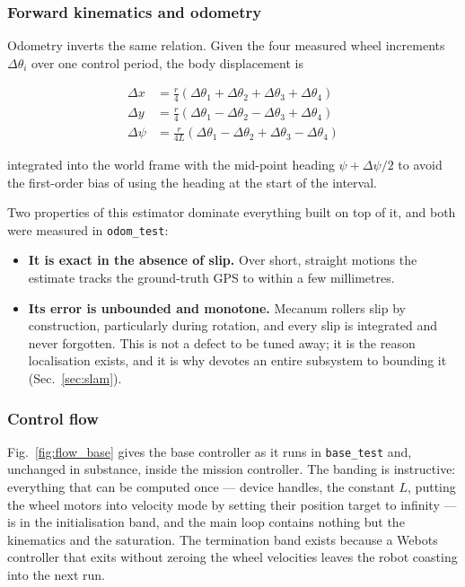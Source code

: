 \subsubsection{Forward kinematics and odometry}

Odometry inverts the same relation. Given the four measured wheel
increments $\Delta\theta_i$ over one control period, the body
displacement is

\begin{align}
\Delta x     &= \tfrac{r}{4}\left(\Delta\theta_1 + \Delta\theta_2
                 + \Delta\theta_3 + \Delta\theta_4\right)\\
\Delta y     &= \tfrac{r}{4}\left(\Delta\theta_1 - \Delta\theta_2
                 - \Delta\theta_3 + \Delta\theta_4\right)\\
\Delta \psi  &= \tfrac{r}{4L}\left(\Delta\theta_1 - \Delta\theta_2
                 + \Delta\theta_3 - \Delta\theta_4\right)
\end{align}

integrated into the world frame with the mid-point heading
$\psi + \Delta\psi/2$ to avoid the first-order bias of using the
heading at the start of the interval.

Two properties of this estimator dominate everything built on top of
it, and both were measured in \texttt{odom\_test}:

\begin{itemize}[leftmargin=*,itemsep=1pt,topsep=2pt]
  \item \textbf{It is exact in the absence of slip.} Over short,
        straight motions the estimate tracks the ground-truth GPS to
        within a few millimetres.
  \item \textbf{Its error is unbounded and monotone.} Mecanum rollers
        slip by construction, particularly during rotation, and every
        slip is integrated and never forgotten. This is not a defect to
        be tuned away; it is the reason localisation exists, and it is
        why \phaseB{} devotes an entire subsystem to bounding it
        (Sec.~\ref{sec:slam}).
\end{itemize}

\subsubsection{Control flow}

Fig.~\ref{fig:flow_base} gives the base controller as it runs in
\texttt{base\_test} and, unchanged in substance, inside the mission
controller. The banding is instructive: everything that can be computed
once --- device handles, the constant $L$, putting the wheel motors into
velocity mode by setting their position target to infinity --- is in the
initialisation band, and the main loop contains nothing but the
kinematics and the saturation. The termination band exists because a
Webots controller that exits without zeroing the wheel velocities leaves
the robot coasting into the next run.


